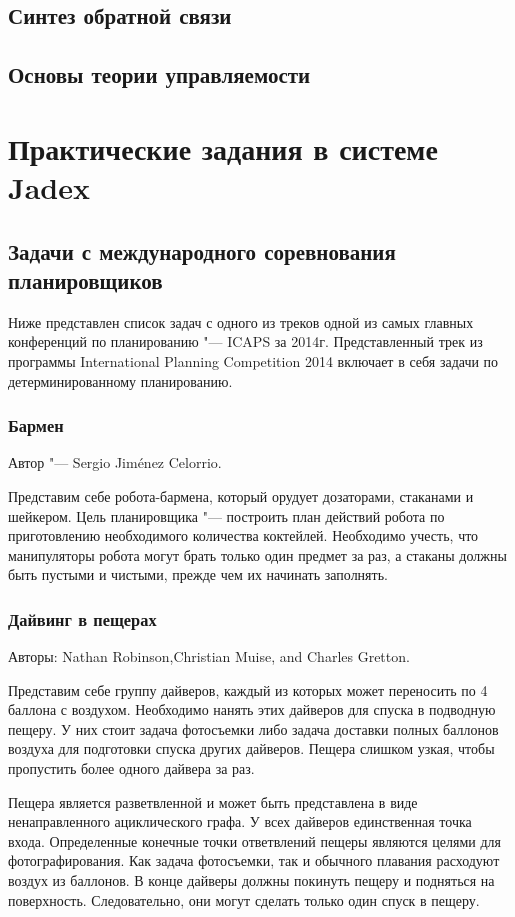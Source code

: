\documentclass[b5paper,11pt]{book}
\numberwithin{Def}{section}
\numberwithin{Th}{chapter}
\numberwithin{St}{chapter}
\begin{document}
	\section{Синтез обратной связи}
	\section{Основы теории управляемости}
	


	\chapter{Практические задания в системе Jadex}
	\section{Задачи с международного соревнования планировщиков}
	Ниже представлен список задач с одного из треков одной из самых главных конференций по планированию "--- ICAPS за 2014г. Представленный трек из программы International Planning Competition 2014 включает в себя задачи по детерминированному планированию.
	\subsection{Бармен}
	Автор "--- Sergio Jiménez Celorrio.
	
	Представим себе робота-бармена, который орудует дозаторами, стаканами и шейкером. Цель планировщика "--- построить план действий робота по приготовлению необходимого количества коктейлей. Необходимо учесть, что манипуляторы робота могут брать только один предмет за раз, а стаканы должны быть пустыми и чистыми, прежде чем их начинать заполнять.
	\subsection{Дайвинг в пещерах}
	Авторы: Nathan Robinson,Christian Muise, and Charles Gretton.
	
	Представим себе группу дайверов, каждый из которых может переносить по 4 баллона с воздухом. Необходимо нанять этих дайверов для спуска в подводную пещеру. У них стоит задача фотосъемки либо задача доставки полных баллонов воздуха для подготовки спуска других дайверов. Пещера слишком узкая, чтобы пропустить более одного дайвера за раз.
	
	Пещера является разветвленной и может быть представлена в виде ненаправленного ациклического графа. У всех дайверов единственная точка входа. Определенные конечные точки ответвлений пещеры являются целями для фотографирования. Как задача фотосъемки, так и обычного плавания расходуют воздух из баллонов. В конце дайверы должны покинуть пещеру и подняться на поверхность. Следовательно, они могут сделать только один спуск в пещеру.
	
\end{document}
